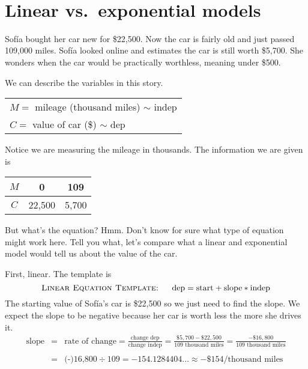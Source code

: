 ~\vspace{0.1in}

\section{Linear vs.\ exponential models}

Sof\'{i}a bought her car new for \$22,500.  Now the car is fairly old and just passed 109,000 miles. Sof\'{i}a looked online and estimates the car is still worth \$5,700.  She wonders when the car would be practically worthless, meaning under \$500.  

We can describe the variables in this story.
\begin{center}
\begin{tabular} {l} 
$M =$ mileage (thousand miles) $\sim$ indep \\
$C=$ value of car (\$) $\sim$ dep \\ 
\end{tabular}
\end{center}
Notice we are measuring the mileage in thousands.
The information we are given is
\begin{center}
\begin{tabular} {|c| |c  |c |}\hline
$M$ & 0 & 109 \\ \hline
$C$ & 22,500 & 5,700  \\ \hline
\end{tabular}
\end{center}
But what's the equation?  Hmm.  Don't know for sure what type of equation might work here.  Tell you what, let's compare what a linear and exponential model would tell us about the value of the car.

First, linear. The template is
$$\textsc{Linear Equation Template: \quad} \text{dep} = \text{start}+\text{slope}\ast\text{indep}$$
The starting value of Sof\'{i}a's car is \$22,500 so we just need to find the slope.  We expect the slope to be negative because her car is worth less the more she drives it.
\begin{eqnarray*}
 \text{slope} & = &\text{rate of change} = \frac{\text{change dep}}{\text{change indep}} = \frac{\$5,700-\$22,500}{109 \text{ thousand miles}} =   \frac{-\$16,800}{109\text{ thousand miles}}\\ \\
 & = & \text{(-)16,800} \div 109 = -154.1284404\ldots \approx -\$\text{154/thousand miles} \\
\end{eqnarray*}  
\vspace{-0.5in} %

